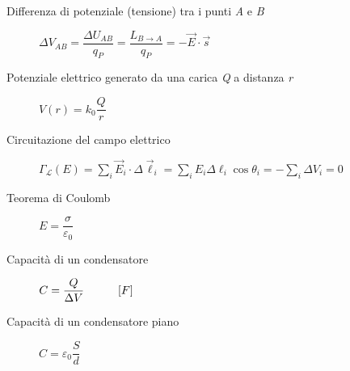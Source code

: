 \documentclass[a4paper,11pt,italian]{article}
\begin{document}
\begin{description}
  \item[Differenza di potenziale (tensione) tra i punti \textit{A} e \textit{B}]
  $  \Delta V_{AB} = \dfrac{\Delta U_{AB}}{q_P} = \dfrac{L_{B \rightarrow A}}{q_P} = - \vec{E} \cdot \vec{s} $
  
  \item[Potenziale elettrico generato da una carica \textit{Q} a distanza \textit{r}]
  $ V(r) = k_0 \dfrac{Q}{r}  $
  
  \item[Circuitazione del campo elettrico]\label{conc:circuitazioneE}
  $ \Gamma_\mathscr{L}(E) = \sum_i  \vec{E}_i \cdot \Delta\vec{\ell}_i = \sum_i E_i \Delta \ell_i \cos \theta_i = - \sum_i \Delta V_i = 0 $
%   
%   
  
  \item[Teorema di Coulomb] 
  $ E = \dfrac{\sigma}{\varepsilon_0} $
  
  \item[Capacità di un condensatore]
  $ C = \dfrac{Q}{\Delta V} \hspace*{3em} [F] $
  
  \item[Capacità di un condensatore piano]
  $ C = \varepsilon_0 \dfrac{S}{d} $
  

\end{description}
\end{document}
